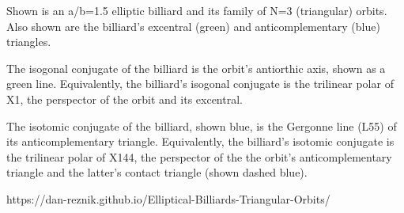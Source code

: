 Shown is an a/b=1.5 elliptic billiard and its family of N=3 (triangular) orbits. Also shown are the billiard's excentral (green) and anticomplementary (blue) triangles.

The isogonal conjugate of the billiard is the orbit's antiorthic axis, shown as a green line. Equivalently, the billiard's isogonal conjugate is the trilinear polar of X1, the perspector of the orbit and its excentral.

The isotomic conjugate of the billiard, shown blue, is the Gergonne line (L55) of its anticomplementary triangle. Equivalently, the billiard's isotomic conjugate is the trilinear polar of X144, the perspector of the the orbit's anticomplementary triangle and the latter's contact triangle (shown dashed blue).

https://dan-reznik.github.io/Elliptical-Billiards-Triangular-Orbits/
